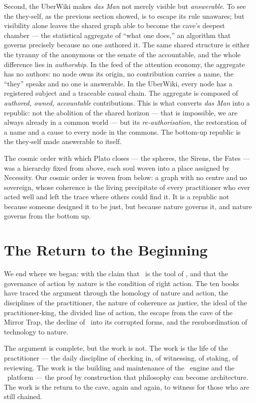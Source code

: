 Second, the UberWiki makes \emph{das Man} not merely visible but
\emph{answerable}. To see the they-self, as the previous section showed, is to
escape its rule unawares; but visibility alone leaves the shared graph able to
become the cave's deepest chamber --- the statistical aggregate of ``what one
does,'' an algorithm that governs precisely because no one authored it. The same
shared structure is either the tyranny of the anonymous or the senate of the
accountable, and the whole difference lies in \emph{authorship}. In the feed of the attention economy,
the aggregate has no authors: no node owns its origin, no contribution carries a
name, the ``they'' speaks and no one is answerable. In the UberWiki, every node
has a registered subject and a traceable causal chain. The aggregate is composed
of \emph{authored, owned, accountable} contributions. This is what converts
\emph{das Man} into a republic: not the abolition of the shared horizon --- that
is impossible, we are always already in a common world --- but its
\emph{re-authorisation}, the restoration of a name and a cause to every node in
the commons. The bottom-up republic is the they-self made answerable to itself.

The cosmic order with which Plato closes --- the spheres, the Sirens, the Fates
--- was a hierarchy fixed from above, each soul woven into a place assigned by
Necessity. Our cosmic order is woven from below: a graph with no centre and no
sovereign, whose coherence is the living precipitate of every practitioner who
ever acted well and left the trace where others could find it. It is a republic
not because someone designed it to be just, but because nature governs it, and
nature governs from the bottom up.

\section{The Return to the Beginning}

We end where we began: with the claim that \praxis\ is the tool of \physis, and
that the governance of action by nature is the condition of right action. The
ten books have traced the argument through the homology of nature and action,
the disciplines of the practitioner, the nature of coherence as justice, the
ideal of the practitioner-king, the divided line of action, the escape from the
cave of the Mirror Trap, the decline of \praxis\ into its corrupted forms, and
the resubordination of technology to nature.

The argument is complete, but the work is not. The work is the life of the
practitioner --- the daily discipline of checking in, of witnessing, of staking,
of reviewing. The work is the building and maintenance of the \physis\ engine
and the \praxis\ platform --- the proof by construction that philosophy can
become architecture. The work is the return to the cave, again and again, to
witness for those who are still chained.


